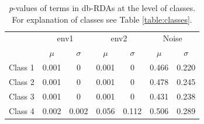 		\begin{table}[h!] 
				
			\small
				\caption{\textit{p}-values of terms in db-RDAs at the level of classes. For explanation of classes see Table \ref{table:classes}.}
				\centering
				
				\begin{tabular}{@{}lcccccc@{}}
					
					\toprule
					& \multicolumn{2}{c}{env1} & \multicolumn{2}{c}{env2} & \multicolumn{2}{c}{Noise}\\\cmidrule(l){2-3} \cmidrule(l){4-5} \cmidrule(l){6-7}
					& $\mu$ & $\sigma$ & $\mu$ & $\sigma$ & $\mu$ & $\sigma$\\
					\hline
					Class 1 & 0.001 & 0 & 0.001 & 0 & 0.466 & 0.220\\
					Class 2 & 0.001 & 0 & 0.001 & 0 & 0.478 & 0.245\\
					Class 3 & 0.001 & 0 & 0.001 & 0 & 0.431 & 0.238\\
					Class 4 & 0.002 & 0.002 & 0.056 & 0.112 & 0.506 & 0.289\\
					\toprule
					
				\end{tabular}
			
				\label{tab:dbsm2}
			
		\end{table}
		
